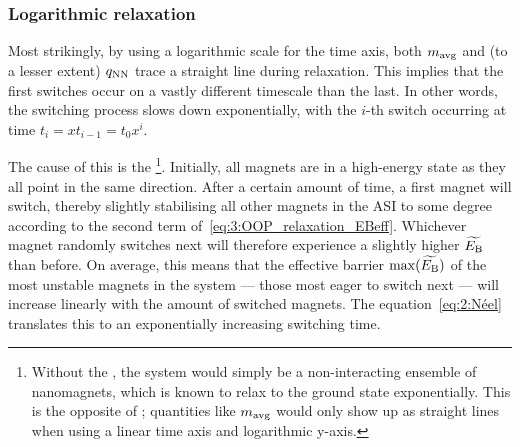 \subsubsection{Logarithmic relaxation}
Most strikingly, by using a logarithmic scale for the time axis, both $m_\mathrm{avg}$ and (to a lesser extent) $q_\mathrm{NN}$ trace a straight line during relaxation.
This  implies that the first switches occur on a vastly different timescale than the last.
In other words, the switching process slows down exponentially, with the $i$-th switch occurring at time $t_i = x t_{i-1} = t_0 x^i$. \par
The cause of this is the \footnote{
	Without the , the system would simply be a non-interacting ensemble of nanomagnets, which is known to relax to the ground state exponentially.
	This is the opposite of ; quantities like $m_\mathrm{avg}$ would only show up as straight lines when using a linear time axis and logarithmic y-axis.
}.
Initially, all magnets are in a high-energy state as they all point in the same direction.
After a certain amount of time, a first magnet will switch, thereby slightly stabilising all other magnets in the ASI to some degree according to the second term of~\cref{eq:3:OOP_relaxation_EBeff}.
Whichever magnet randomly switches next will therefore experience a slightly higher  $\widetilde{E_\mathrm{B}}$ than before.
On average, this means that the effective barrier $\max(\widetilde{E_\mathrm{B}})$ of the most unstable magnets in the system --- those most eager to switch next --- will increase linearly with the amount of switched magnets.
The  equation~\eqref{eq:2:Néel} translates this to an exponentially increasing switching time. \\\par

